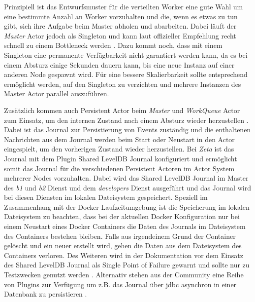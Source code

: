 Prinzipiell ist das Entwurfsmuster für die verteilten Worker eine gute Wahl um eine bestimmte Anzahl an Worker vorzuhalten und die, wenn es etwas zu tun gibt, sich ihre Aufgabe beim Master abholen und abarbeiten. Dabei läuft der \textit{Master} Actor jedoch als Singleton und kann laut offizieller Empfehlung recht schnell zu einem Bottleneck werden \cite{akka_singleton}. Dazu kommt noch, dass mit einem Singleton eine permanente Verfügbarkeit nicht garantiert werden kann, da es bei einem Absturz einige Sekunden dauern kann, bis eine neue Instanz auf einer anderen Node gespawnt wird. Für eine bessere Skalierbarkeit sollte entsprechend ermöglicht werden, auf den Singleton zu verzichten und mehrere Instanzen des Master Actor parallel auszuführen.

Zusätzlich kommen auch Persistent Actor beim \textit{Master} und \textit{WorkQueue} Actor zum Einsatz, um den internen Zustand nach einem Absturz wieder herzustellen \cite{akka_persistence}. Dabei ist das Journal zur Persistierung von Events zuständig und die enthaltenen Nachrichten aus dem Journal werden beim Start oder Neustart in den Actor eingespielt, um den vorherigen Zustand wieder herzustellen. Bei \textit{Zeta} ist das Journal mit dem Plugin Shared LevelDB Journal konfiguriert und ermöglicht somit das Journal für die verschiedenen Persistent Actoren im Actor System mehrerer Nodes vorzuhalten. Dabei wird das Shared LevelDB Journal im Master des \textit{b1} und \textit{b2} Dienst und dem \textit{developers} Dienst ausgeführt \cite{zeta_backend_main} und das Journal wird bei diesen Diensten im lokalen Dateisystem gespeichert. Speziell im Zusammenhang mit der Docker Laufzeitumgebung ist die Speicherung im lokalen Dateisystem zu beachten, dass bei der aktuellen Docker Konfiguration nur bei einem Neustart eines Docker Containers die Daten des Journals im Dateisystem des Containers bestehen bleiben. Falls aus irgendeinem Grund der Container gelöscht und ein neuer erstellt wird, gehen die Daten aus dem Dateisystem des Containers verloren. Des Weiteren wird in der Dokumentation vor dem Einsatz des Shared LevelDB Journal als Single Point of Failure gewarnt und sollte nur zu Testzwecken genutzt werden \cite{akka_persistence}. Alternativ stehen aus der Community eine Reihe von Plugins zur Verfügung um z.B. das Journal über \ac{jdbc} asynchron in einer Datenbank zu persistieren \cite{akka_persistence_plugins} \cite{akka_persistence_jdbc}.

